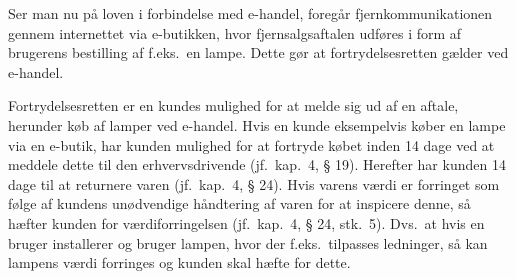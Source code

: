 Ser man nu på loven i forbindelse med e-handel, foregår fjernkommunikationen gennem internettet via e-butikken, hvor fjernsalgsaftalen udføres i form af brugerens bestilling af f.eks.\ en lampe. Dette gør at fortrydelsesretten gælder ved e-handel.

Fortrydelsesretten er en kundes mulighed for at melde sig ud af en aftale, herunder køb af lamper ved e-handel. Hvis en kunde eksempelvis køber en lampe via en e-butik, har kunden mulighed for at fortryde købet inden 14 dage ved at meddele dette til den erhvervsdrivende (jf.\ kap.\ 4, § 19). Herefter har kunden 14 dage til at returnere varen (jf.\ kap.\ 4, § 24). Hvis varens værdi er forringet som følge af kundens unødvendige håndtering af varen for at inspicere denne, så hæfter kunden for værdiforringelsen (jf.\ kap.\ 4, § 24, stk.\ 5). Dvs.\ at hvis en bruger installerer og bruger lampen, hvor der f.eks.\ tilpasses ledninger, så kan lampens værdi forringes og kunden skal hæfte for dette. 
